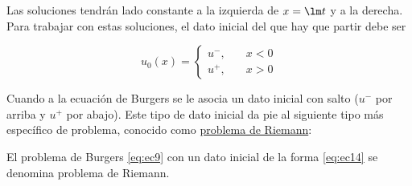 \begin{figure}[H]
    \begin{center}

    \end{center}
\end{figure}

Las soluciones tendrán lado constante a la izquierda de $x = \lm t$ y a la derecha. Para trabajar con estas soluciones, el dato inicial del que hay que partir debe ser 

\begin{equation}\label{eq:ec14}
    u_0(x) = \begin{cases}
        u^{-}, \quad& x < 0 \\
        u^{+}, \quad& x > 0
    \end{cases}
\end{equation}


Cuando a la ecuación de Burgers se le asocia un dato inicial con salto ($u^{-}$ por arriba y $u^{+}$ por abajo). Este tipo de dato inicial da pie al siguiente tipo más específico de problema, conocido como \underline{problema de Riemann}:
\begin{definicion}\label{definicion:d21}
    El problema de Burgers \eqref{eq:ec9} con un dato inicial de la forma \eqref{eq:ec14} se denomina problema de Riemann. \\
\end{definicion}

